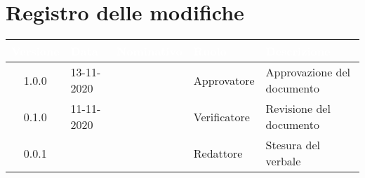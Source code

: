 \section*{Registro delle modifiche}
{
\renewcommand{\arraystretch}{1.5}
\centering
\begin{longtable}{c C{2.6cm}  C{2.6cm} C{2.6cm} C{3.5cm}}
\textcolor{white}{\textbf{Versione}}&
\textcolor{white}{\textbf{Data}}&
\textcolor{white}{\textbf{Nominativo}}&
\textcolor{white}{\textbf{Ruolo}}&
\textcolor{white}{\textbf{Descrizione}}\\	
\endhead
		
1.0.0 & 13-11-2020 & \Approvatore{} & Approvatore & Approvazione del documento\\

0.1.0 & 11-11-2020 & \Verificatori{} & Verificatore & Revisione del documento\\

0.0.1 & \Data{} & \Redattori{} & Redattore & Stesura del verbale\\
		
\end{longtable}
}
